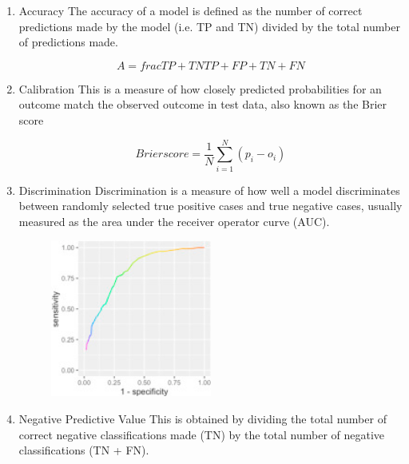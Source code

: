 \begin{enumerate}
    \item Accuracy \newline
    The accuracy of a model is defined as the number of correct predictions made by the model (i.e. TP and TN) divided by the total number of predictions made.
    
    \begin{equation}
        A = frac{TP + TN}{TP + FP + TN + FN}
    \end{equation}
    
    \item Calibration\newline
    This is a measure of how closely predicted probabilities for an outcome match the observed outcome in test data, also known as the Brier score
    
    \begin{equation}
        Brier score = \frac{1}{N} \sum_{i=1}^{N} (p_{i} - o_{i})
    \end{equation}
    
    \item{Discrimination}
    Discrimination is a measure of how well a model discriminates between randomly selected true positive cases and true negative cases, usually measured as the area under the receiver operator curve (AUC).
    
    \begin{figure}[H]
    \centering
    \includegraphics[width=0.5\textwidth]{ThesisTemplate/usingLatex/images/AUC.png}
    \label{fig:aucLearning}
    \end{figure}
    
    \item{Negative Predictive Value}
    This is obtained by dividing the total number of correct negative classifications made (TN) by the total number of negative classifications (TN + FN).
    

\end{enumerate}
